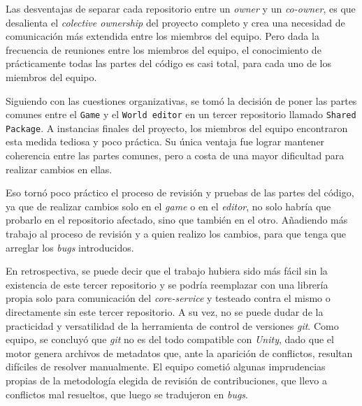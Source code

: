 \vspace{0.25cm}

Las desventajas de separar cada repositorio entre un \textit{owner} y un \textit{co-owner}, es que desalienta el 
\textit{colective ownership} del proyecto completo y crea una necesidad de comunicación más extendida entre los miembros 
del equipo. Pero dada la frecuencia de reuniones entre los miembros del equipo, el conocimiento de prácticamente todas 
las partes del código es casi total, para cada uno de los miembros del equipo.

\vspace{0.25cm}

Siguiendo con las cuestiones organizativas, se tomó la decisión de poner las partes comunes entre el
\texttt{Game} y el \texttt{World editor} en un tercer repositorio llamado \texttt{Shared Package}. A instancias finales 
del proyecto, los miembros del equipo encontraron esta medida tediosa y poco práctica. Su única ventaja 
fue lograr mantener coherencia entre las partes comunes, pero a costa de una mayor dificultad para realizar 
cambios en ellas.

\vspace{0.25cm}

Eso tornó poco práctico el proceso de revisión y pruebas de las partes del código, ya que de realizar cambios solo en el 
\textit{game} o en el \textit{editor}, no solo habría que probarlo en el repositorio afectado, sino que también en el otro. 
Añadiendo más trabajo al proceso de revisión y a quien realizo los cambios, para que tenga que arreglar los \textit{bugs} 
introducidos.

\vspace{0.25cm}

En retrospectiva, se puede decir que el trabajo hubiera sido más fácil sin la existencia de este tercer repositorio y 
se podría reemplazar con una librería propia solo para comunicación del \textit{core-service} y testeado contra el mismo o 
directamente sin este tercer repositorio. A su vez, no se puede dudar de la practicidad y versatilidad de la herramienta de 
control de versiones \textit{git}. Como equipo, se concluyó que \textit{git} no es del todo compatible con \textit{Unity}, 
dado que el motor genera archivos de metadatos que, ante la aparición de conflictos, resultan difíciles de resolver 
manualmente. El equipo cometió algunas imprudencias propias de la metodología elegida de revisión de contribuciones, que llevo a conflictos 
mal resueltos, que luego se tradujeron en \textit{bugs}.

